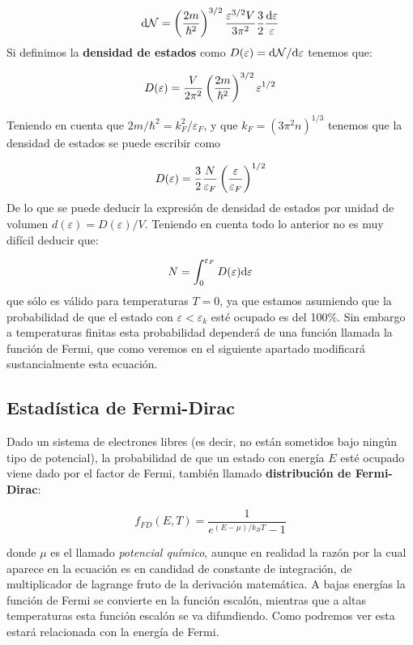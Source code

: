 \begin{equation}
	\mathrm{d} \mathcal{N} =\left( \frac{2m}{\hbar^2} \right)^{3/2} \frac{ \varepsilon^{3/2} V}{3\pi^2}\frac{3}{2} \frac{\mathrm{d} \varepsilon}{\varepsilon}
\end{equation}
Si definimos la \textbf{densidad de estados} como $D(\varepsilon) = \mathrm{d} \mathcal{N} / \mathrm{d} \varepsilon$ tenemos que:
\begin{mybox}
\begin{equation}
	D(\varepsilon) = \frac{V}{2\pi^2} \left( \frac{2m}{\hbar^2} \right)^{3/2} \varepsilon^{1/ 2}
\end{equation}
\end{mybox}
Teniendo en cuenta que $2m/\hbar^2 = k_F^2 / \varepsilon_F$, y que $k_F=(3\pi^2 n)^{1/3}$ tenemos que la densidad de estados se puede escribir como

\begin{equation}
	D(\varepsilon)  = \frac{3}{2}  \frac{N}{\varepsilon_F} \left( \frac{\varepsilon}{\varepsilon_F} \right)^{1/2}
\end{equation}
De lo que se puede deducir la expresión de densidad de estados por unidad de volumen $d(\varepsilon)=D(\varepsilon)/V$. Teniendo en cuenta todo lo anterior no es muy difícil deducir que:

\begin{equation}
	N = \int_{0}^{\varepsilon_F} D(\varepsilon) \mathrm{d} \varepsilon
\end{equation}
que sólo es válido para temperaturas $T=0$, ya que estamos asumiendo que la probabilidad de que el estado con $\varepsilon<\varepsilon_k$ esté ocupado es del 100\%. Sin embargo a temperaturas finitas esta probabilidad dependerá de una función llamada la función de Fermi, que como veremos en el siguiente apartado modificará sustancialmente esta ecuación. 

\subsection{Estadística de Fermi-Dirac}

Dado un sistema de electrones libres (es decir, no están sometidos bajo ningún tipo de potencial), la probabilidad de que un estado con energía $E$ esté ocupado viene dado por el factor de Fermi, también llamado \textbf{distribución de Fermi-Dirac}:
\begin{mybox}\begin{equation}
	f_{FD} (E,T) = \dfrac{1}{e^{(E-\mu)/k_BT}-1}
\end{equation}\end{mybox}
donde $\mu$ es el llamado \textit{potencial químico}, aunque en realidad la razón por la cual aparece en la ecuación es en candidad de constante de integración, de multiplicador de lagrange fruto de la derivación matemática. A bajas energías la función de Fermi se convierte en la función escalón, mientras que a altas temperaturas esta función escalón se va difundiendo. Como podremos ver esta estará relacionada con la energía de Fermi.

